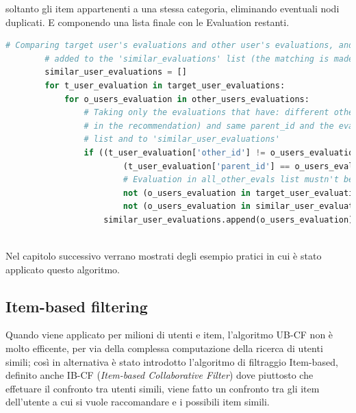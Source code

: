 \begin{itemize}
	soltanto gli item appartenenti a una stessa categoria, eliminando eventuali nodi duplicati. E componendo una lista finale con le Evaluation
	restanti.
	\begin{lstlisting}[language=Python, label=lst:UB_CF_4]
		# Comparing target user's evaluations and other user's evaluations, and if there is a match the evaluation is
		# added to the 'similar_evaluations' list (the matching is made comparing the 'parent_id')
		similar_user_evaluations = []
		for t_user_evaluation in target_user_evaluations:
			for o_users_evaluation in other_users_evaluations:
				# Taking only the evaluations that have: different other_id (excluding the target evaluation
				# in the recommendation) and same parent_id and the evaluations that weren't added to 'target_user_evaluations'
				# list and to 'similar_user_evaluations'
				if ((t_user_evaluation['other_id'] != o_users_evaluation['other_id']) and  # Evaluations must have different 'other_id'
						(t_user_evaluation['parent_id'] == o_users_evaluation['parent_id']) and  # Evaluations must have the same 'parent_id'
						# Evaluation in all_other_evals list mustn't be already added to \
						not (o_users_evaluation in target_user_evaluations) and  # the 'target_user_evaluations' list or
						not (o_users_evaluation in similar_user_evaluations)):  # the 'similar_user_evaluations' list
					similar_user_evaluations.append(o_users_evaluation)
	\end{lstlisting}
\end{itemize}

\ \\
Nel capitolo successivo verrano mostrati degli esempio pratici in cui è stato applicato questo algoritmo.

\newpage

\subsection{Item-based filtering} 
Quando viene applicato per milioni di utenti e item, l'algoritmo UB-CF non è molto efficente, per via della complessa computazione della 
ricerca di utenti simili; così in alternativa è stato introdotto l'algoritmo di filtraggio Item-based, definito anche IB-CF 
(\textit{Item-based Collaborative Filter}) dove piuttosto che effetuare il confronto tra utenti simili, viene fatto un confronto tra 
gli item dell'utente a cui si vuole raccomandare e i possibili item simili.

